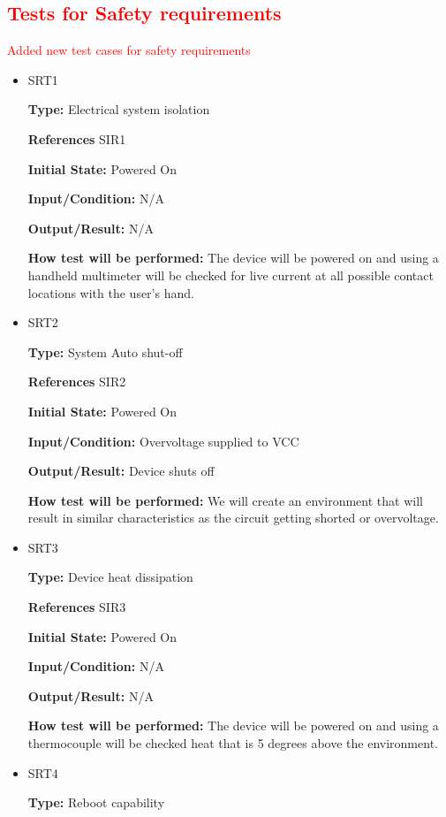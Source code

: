 \documentclass[12pt, titlepage]{article}
\begin{document}
\subsection{\textcolor{red}{Tests for Safety requirements}}
\textcolor{red}{Added new test cases for safety requirements}
\begin{itemize}
    \item{SRT1} 

\textbf{Type:} Electrical system isolation

\textbf{References} SIR1
					
\textbf{Initial State:} Powered On
					
\textbf{Input/Condition:} N/A
					
\textbf{Output/Result:} N/A
					
\textbf{How test will be performed:} The device will be powered on and using a handheld multimeter will be checked for live current at all possible contact locations with the user's hand.

\item{SRT2} 

\textbf{Type:} System Auto shut-off

\textbf{References} SIR2 
					
\textbf{Initial State:} Powered On
					
\textbf{Input/Condition:} Overvoltage supplied to VCC
					
\textbf{Output/Result:} Device shuts off
					
\textbf{How test will be performed:} We will create an environment that will result in similar characteristics as the circuit getting shorted or overvoltage.

\item{SRT3} 

\textbf{Type:} Device heat dissipation

\textbf{References} SIR3 
					
\textbf{Initial State:} Powered On
					
\textbf{Input/Condition:} N/A
					
\textbf{Output/Result:} N/A
					
\textbf{How test will be performed:} The device will be powered on and using a thermocouple will be checked heat that is 5 degrees above the environment.

\item{SRT4} 

\textbf{Type:} Reboot capability


\end{itemize}
\end{document}
